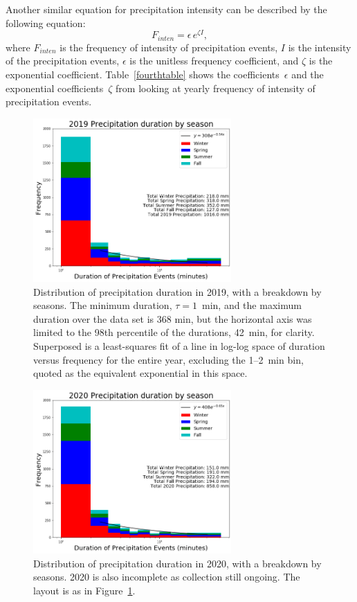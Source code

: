 \documentclass[11pt]{report}
\begin{document}
Another similar equation for precipitation intensity can be described by the following equation: 
\begin{equation}\label{expod_inten}
	F_{inten} = \epsilon \,e^{\zeta I},
\end{equation}
where $F_{inten}$ is the frequency of intensity of precipitation events, $I$ is the intensity of the precipitation events, $\epsilon$ is the unitless frequency coefficient, and $\zeta$ is the exponential coefficient. Table~\ref{fourthtable} shows the coefficients~$\epsilon$ and the exponential coefficients~$\zeta$ from looking at yearly frequency of intensity of precipitation events.  
\clearpage
\begin{figure}[t]
  \centering
  \includegraphics[width=0.675\textwidth]{Figures/More_detail_precip_2019.png}
  \caption[Precipitation histogram for 2019 broken down by
    season]{\label{p2019} Distribution of precipitation duration in
    2019, with a breakdown by seasons. The minimum duration,
    $\tau=1$~min, and the maximum duration over the data set is 368
    min, but the horizontal axis was limited to the 98th percentile of
    the durations, 42~min, for clarity. Superposed is a least-squares
    fit of a line in log-log space of duration versus frequency for
    the entire year, excluding the 1--2~min bin, quoted as the
    equivalent exponential in this space.}
\end{figure}
\begin{figure}[b]
  \centering
  \includegraphics[width=0.675\textwidth]{Figures/precip_2020.png}
  \caption[Precipitation histogram for 2020 broken down by
    season]{\label{p2020} Distribution of precipitation duration
    in 2020, with a breakdown by seasons. 2020 is also
    incomplete as collection still ongoing. The layout is as in
    Figure~\ref{p2019}.}
\end{figure}
\end{document}
